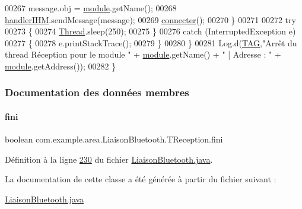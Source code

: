 \begin{DoxyCode}
00267                     message.obj = \hyperlink{classcom_1_1example_1_1area_1_1_liaison_bluetooth_a80068a7178f6c84eae7bab50cf0a784a}{module}.getName();
00268                     \hyperlink{classcom_1_1example_1_1area_1_1_liaison_bluetooth_ace2c20759fc96d3ae787f1f726fd2691}{handlerIHM}.sendMessage(message);
00269                     \hyperlink{classcom_1_1example_1_1area_1_1_liaison_bluetooth_a7b9662a4224762b23c814d1f4539002a}{connecter}();
00270                 \}
00271 
00272                 \textcolor{keywordflow}{try}
00273                 \{
00274                     \hyperlink{class_thread}{Thread}.sleep(250);
00275                 \}
00276                 \textcolor{keywordflow}{catch} (InterruptedException e)
00277                 \{
00278                     e.printStackTrace();
00279                 \}
00280             \}
00281             Log.d(\hyperlink{classcom_1_1example_1_1area_1_1_liaison_bluetooth_ac51aa4b63fae5c36734a061cc05d7fc9}{TAG},\textcolor{stringliteral}{"Arrêt du thread Réception pour le module "} + \hyperlink{classcom_1_1example_1_1area_1_1_liaison_bluetooth_a80068a7178f6c84eae7bab50cf0a784a}{module}.getName() + \textcolor{stringliteral}{" | Adresse
       : "} + \hyperlink{classcom_1_1example_1_1area_1_1_liaison_bluetooth_a80068a7178f6c84eae7bab50cf0a784a}{module}.getAddress());
00282         \}
\end{DoxyCode}


\subsubsection{Documentation des données membres}
\mbox{\label{classcom_1_1example_1_1area_1_1_liaison_bluetooth_1_1_t_reception_a7f942e7af3e97af754f2591d2bd20435}} 
\paragraph{\texorpdfstring{fini}{fini}}
{\footnotesize\ttfamily boolean com.\+example.\+area.\+Liaison\+Bluetooth.\+T\+Reception.\+fini\hspace{0.3cm}{\ttfamily [private]}}



Définition à la ligne \hyperlink{_liaison_bluetooth_8java_source_l00230}{230} du fichier \hyperlink{_liaison_bluetooth_8java_source}{Liaison\+Bluetooth.\+java}.



La documentation de cette classe a été générée à partir du fichier suivant \+:\begin{DoxyCompactItemize}
\item 
\hyperlink{_liaison_bluetooth_8java}{Liaison\+Bluetooth.\+java}\end{DoxyCompactItemize}
